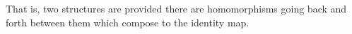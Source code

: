\begin{code}
\AgdaSpace{}%
\AgdaSpace{}%
\AgdaSpace{}%
\AgdaSpace{}%
\AgdaSpace{}%
\AgdaSymbol{)}\AgdaSpace{}%
\AgdaSpace{}%
\AgdaSymbol{(}\AgdaSpace{}%
\AgdaSpace{}%
\AgdaSpace{}%
\AgdaSpace{}%
\AgdaSpace{}%
\AgdaSpace{}%
\AgdaSpace{}%
\AgdaSpace{}%
\AgdaSpace{}%
\AgdaSpace{}%
\AgdaSpace{}%
\AgdaSymbol{)}\<%
\end{code}
\ccpad
That is, two structures are  provided there are homomorphisms going back and forth between them which compose to the identity map.

